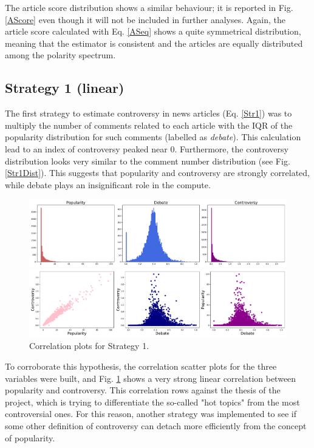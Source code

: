 The article score distribution shows a similar behaviour; it is reported in Fig. \ref{AScore} even though it will not be included in further analyses. Again, the article score calculated with Eq. \ref{ASeq} shows a quite symmetrical distribution, meaning that the estimator is consistent and the articles are equally distributed among the polarity spectrum.

\subsection{Strategy 1 (linear)}
\label{Strategy1}
The first strategy to estimate controversy in news articles (Eq. \ref{Str1}) was to multiply the number of comments related to each article with the IQR of the popularity distribution for such comments (labelled as \textit{debate}). This calculation lead to an index of controversy peaked near 0. Furthermore, the controversy distribution looks very similar to the comment number distribution (see Fig. \ref{Str1Dist}). This suggests that popularity and controversy are strongly correlated, while debate plays an insignificant role in the compute. 

\begin{figure}[h]
\centering
\includegraphics[width=\tw]{Pictures/Strat1Dist.pdf}
\caption{Popularity, Debate and Controversy distributions for Strategy 1}
\label{Str1Dist}
\centering
\includegraphics[width=\tw]{Pictures/Strat1Corr.pdf}
\caption{Correlation plots for Strategy 1.}
\label{Str1Corr}
\end{figure}

To corroborate this hypothesis, the correlation scatter plots for the three variables were built, and Fig. \ref{Str1Corr} shows a very strong linear correlation between popularity and controversy. This correlation rows against the thesis of the project, which is trying to differentiate the so-called "hot topics" from the most controversial ones. For this reason, another strategy was implemented to see if some other definition of controversy can detach more efficiently from the concept of popularity.

